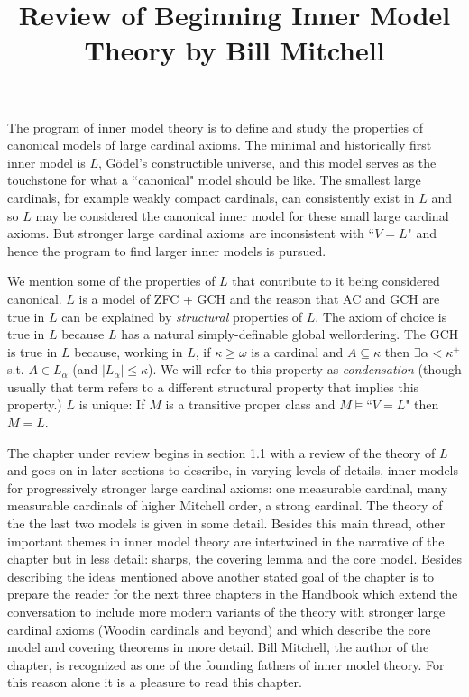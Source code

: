 \documentclass[oneside,12pt]{amsart}
\begin{document}
\title{Review of Beginning Inner Model Theory by Bill Mitchell}

\maketitle

The program of inner model theory is to define and study the properties of
canonical models of large cardinal axioms. The minimal and historically first
inner model is $L$, G\"{o}del's constructible universe, and this model serves
as the touchstone for what a ``canonical" model should be like. The smallest
large cardinals, for example weakly compact cardinals, can consistently exist
in $L$ and so $L$ may be considered the canonical inner model for these small
large cardinal axioms. But stronger large cardinal axioms are inconsistent
with ``$V=L$" and hence the program to find larger inner models is pursued.

We mention some of the properties of $L$ that contribute to it being considered
canonical. $L$ is a model of ZFC + GCH and the reason that AC and GCH are true
in $L$ can be explained by \emph{structural} properties of $L$. The axiom of choice
is true in $L$ because $L$ has a natural simply-definable global wellordering.
The GCH is true in $L$ because, working in $L$, if $\kappa\geq\omega$ is a cardinal
and $A\subseteq\kappa$  then $\exists \alpha<\kappa^{+}$ s.t.
$A\in L_{\alpha}$ (and $|L_{\alpha}| \leq \kappa$).
We will refer to this property as \emph{condensation} (though usually that term refers
to a different structural property that implies this property.)
$L$ is unique: If $M$ is a transitive proper class and $M\models$``$V=L$" then $M=L$.

The chapter under review begins in section 1.1 with a review of the theory of $L$
and goes on in later sections to describe, in varying levels of details, inner
models for progressively stronger large cardinal axioms: one measurable cardinal,
many measurable cardinals of higher Mitchell order, a strong cardinal. The theory
of the the last two models is given in some detail. Besides this main thread,
other important themes in inner model theory are intertwined in the narrative
of the chapter but in less detail: sharps, the covering lemma and the core model.
Besides describing the ideas mentioned above another stated goal of the chapter
is to prepare the reader for the next three chapters
in the Handbook which extend the conversation to include more
modern variants of the theory with stronger large cardinal axioms (Woodin cardinals
and beyond) and which describe the core model and covering theorems in more detail.
Bill Mitchell, the author of the chapter, is recognized as one of the founding
fathers of inner model theory. For this reason alone it is a pleasure to read
this chapter.
\end{document}

